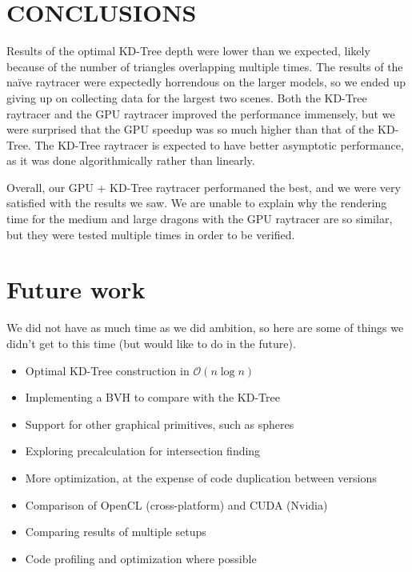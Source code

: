 \documentclass[letterpaper, 10 pt, conference]{ieeeconf}  %
\begin{document}
\section{CONCLUSIONS}
Results of the optimal KD-Tree depth were lower than we expected, likely because of the number of triangles overlapping multiple times. The results of the naïve raytracer were expectedly horrendous on the larger models, so we ended up giving up on collecting data for the largest two scenes. Both the KD-Tree raytracer and the GPU raytracer improved the performance immensely, but we were surprised that the GPU speedup was so much higher than that of the KD-Tree. The KD-Tree raytracer is expected to have better asymptotic performance, as it was done algorithmically rather than linearly.

Overall, our GPU + KD-Tree raytracer performaned the best, and we were very satisfied with the results we saw. We are unable to explain why the rendering time for the medium and large dragons with the GPU raytracer are so similar, but they were tested multiple times in order to be verified.

\addtolength{\textheight}{-12cm}   %


\section*{Future work}
We did not have as much time as we did ambition, so here are some of things we didn't get to this time (but would like to do in the future).
\begin{itemize}
\item Optimal KD-Tree construction in $\mathcal{O}(n\log{n})$
\item Implementing a BVH to compare with the KD-Tree
\item Support for other graphical primitives, such as spheres
\item Exploring precalculation for intersection finding
\item More optimization, at the expense of code duplication between versions
\item Comparison of OpenCL (cross-platform) and CUDA (Nvidia)
\item Comparing results of multiple setups
\item Code profiling and optimization where possible
\end{itemize}
\end{document}
